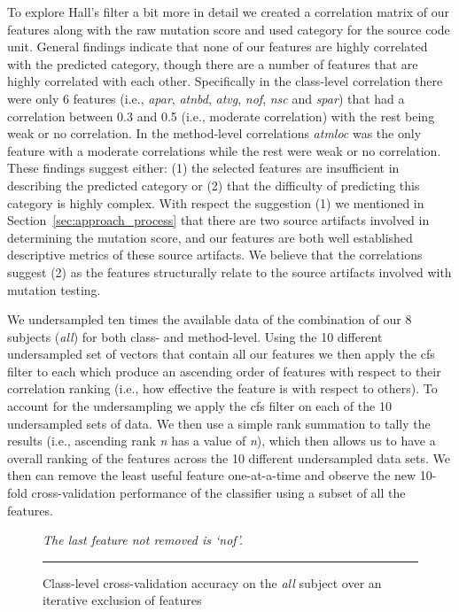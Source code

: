 To explore Hall's filter a bit more in detail we created a correlation matrix of our features along with the raw mutation score and used category for the source code unit. General findings indicate that none of our features are highly correlated with the predicted category, though there are a number of features that are highly correlated with each other. Specifically in the class-level correlation there were only 6 features (i.e., \emph{apar}, \emph{atnbd}, \emph{atvg}, \emph{nof}, \emph{nsc} and \emph{spar}) that had a correlation between 0.3 and 0.5 (i.e., moderate correlation) with the rest being weak or no correlation. In the method-level correlations \emph{atmloc} was the only feature with a moderate correlations while the rest were weak or no correlation. These findings suggest either: (1) the selected features are insufficient in describing the predicted category or (2) that the difficulty of predicting this category is highly complex. With respect the suggestion (1) we mentioned in Section~\ref{sec:approach_process} that there are two source artifacts involved in determining the mutation score, and our features are both well established descriptive metrics of these source artifacts. We believe that the correlations suggest (2) as the features structurally relate to the source artifacts involved with mutation testing.

We undersampled ten times the available data of the combination of our 8 subjects (\emph{all}) for both class- and method-level. Using the 10 different undersampled set of vectors that contain all our features we then apply the \gls{cfs} filter to each which produce an ascending order of features with respect to their correlation ranking (i.e., how effective the feature is with respect to others). To account for the undersampling we apply the \gls{cfs} filter on each of the 10 undersampled sets of data. We then use a simple rank summation to tally the results (i.e., ascending rank \emph{n} has a value of \emph{n}), which then allows us to have a overall ranking of the features across the 10 different undersampled data sets. We then can remove the least useful feature one-at-a-time and observe the new 10-fold cross-validation performance of the classifier using a subset of all the features.

\begin{figure}[ht!]
  \centering
  \begin{adjustbox}{max size={.95\textwidth}{.95\textheight}}
    
  \end{adjustbox}
  \caption{Class-level cross-validation accuracy on the \emph{all} subject over an iterative exclusion of features}
  \vspace{1mm}
  \footnotesize{\emph{The last feature not removed is `nof'.}}
  \vspace{2mm}
  \hrule
  \label{fig:cross_validation_feature_selection_class_graph}
\end{figure}

